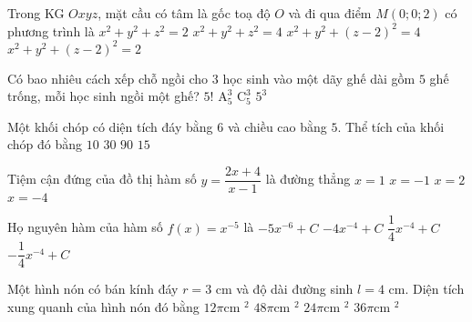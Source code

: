 \begin{ex}%
Trong KG $Oxyz$, mặt cầu có tâm là gốc toạ độ $O$ và đi qua điểm $M(0; 0; 2)$ có phương trình là
\choice
{$x^2 + y^2 + z^2 = 2$}
{\True $x^2 + y^2 + z^2 = 4$}
{$x^2 + y^2 + (z-2)^2 = 4$}
{$x^2 + y^2 + (z-2)^2 = 2$}
\end{ex}
\begin{ex}%
Có bao nhiêu cách xếp chỗ ngồi cho $3$ học sinh vào một dãy ghế dài gồm $5$ ghế trống, mỗi học sinh ngồi một ghế?
\choice
{$5!$}
{\True $\mathrm{A}_5^3$}
{$\mathrm{C}_5^3$}
{$5^3$}
\end{ex}
\begin{ex}%
Một khối chóp có diện tích đáy bằng $6$ và chiều cao bằng $5$. Thể tích của khối chóp đó bằng
\choice
{\True $10$}
{$30$}
{$90$}
{$15$}
\end{ex}
\begin{ex}%
Tiệm cận đứng của đồ thị hàm số $y = \dfrac{2x + 4}{x - 1}$ là đường thẳng
\choice
{\True $x = 1$}
{$x =-1$}
{$x = 2$}
{$x = -4$}
\end{ex}
\begin{ex}%
Họ nguyên hàm của hàm số $f(x) = x^{-5}$ là
\choice
{$-5x^{-6} + C$}
{$-4x^{-4} + C$}
{$\dfrac{1}{4}x^{-4} + C$}
{\True $-\dfrac{1}{4}x^{-4} + C$}
\end{ex}
\begin{ex}%
Một hình nón có bán kính đáy $r = 3$ cm và độ dài đường sinh $l = 4$ cm. Diện tích xung quanh của hình nón đó bằng
\choice
{\True $12 \pi$cm $^2$}
{$48 \pi$cm $^2$}
{$24 \pi$cm $^2$}
{$36 \pi$cm $^2$}
\end{ex}
